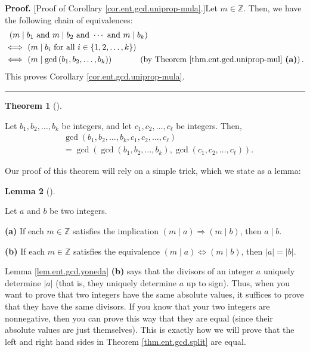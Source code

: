 \documentclass[numbers=enddot,12pt,final,onecolumn,notitlepage]{scrartcl}%
\numberwithin{exer}{subsection}
\theoremstyle{definition}
\newtheorem{theo}{Theorem}[subsection]
\newenvironment{theorem}[1][]
{\begin{theo}[#1]\begin{leftbar}}
{\end{leftbar}\end{theo}}
\newtheorem{lem}[theo]{Lemma}
\newenvironment{lemma}[1][]
{\begin{lem}[#1]\begin{leftbar}}
{\end{leftbar}\end{lem}}
\newenvironment{proof}[1][Proof]{\noindent\textbf{#1.} }{\ \rule{0.5em}{0.5em}}
\begin{document}
\begin{proof}
[Proof of Corollary \ref{cor.ent.gcd.uniprop-mula}.]Let $m\in\mathbb{Z}$.
Then, we have the following chain of equivalences:%
\begin{align*}
&  \ \left(  m\mid b_{1}\text{ and }m\mid b_{2}\text{ and }\cdots\text{ and
}m\mid b_{k}\right) \\
&  \Longleftrightarrow\ \left(  m\mid b_{i}\text{ for all }i\in\left\{
1,2,\ldots,k\right\}  \right) \\
&  \Longleftrightarrow\ \left(  m\mid\gcd\left(  b_{1},b_{2},\ldots
,b_{k}\right)  \right)  \ \ \ \ \ \ \ \ \ \ \left(  \text{by Theorem
\ref{thm.ent.gcd.uniprop-mul} \textbf{(a)}}\right)  .
\end{align*}
This proves Corollary \ref{cor.ent.gcd.uniprop-mula}.
\end{proof}

\begin{theorem}
\label{thm.ent.gcd.split}Let $b_{1},b_{2},\ldots,b_{k}$ be integers, and let
$c_{1},c_{2},\ldots,c_{\ell}$ be integers. Then,%
\begin{align*}
&  \gcd\left(  b_{1},b_{2},\ldots,b_{k},c_{1},c_{2},\ldots,c_{\ell}\right) \\
&  =\gcd\left(  \gcd\left(  b_{1},b_{2},\ldots,b_{k}\right)  ,\gcd\left(
c_{1},c_{2},\ldots,c_{\ell}\right)  \right)  .
\end{align*}

\end{theorem}

Our proof of this theorem will rely on a simple trick, which we state as a lemma:

\begin{lemma}
\label{lem.ent.gcd.yoneda}Let $a$ and $b$ be two integers.

\textbf{(a)} If each $m\in\mathbb{Z}$ satisfies the implication $\left(  m\mid
a\right)  \Longrightarrow\left(  m\mid b\right)  $, then $a\mid b$.

\textbf{(b)} If each $m\in\mathbb{Z}$ satisfies the equivalence $\left(  m\mid
a\right)  \Longleftrightarrow\left(  m\mid b\right)  $, then $\left\vert
a\right\vert =\left\vert b\right\vert $.
\end{lemma}

Lemma \ref{lem.ent.gcd.yoneda} \textbf{(b)} says that the divisors of an
integer $a$ uniquely determine $\left\vert a\right\vert $ (that is, they
uniquely determine $a$ up to sign). Thus, when you want to prove that two
integers have the same absolute values, it suffices to prove that they have
the same divisors. If you know that your two integers are nonnegative, then
you can prove this way that they are equal (since their absolute values are
just themselves). This is exactly how we will prove that the left and right
hand sides in Theorem \ref{thm.ent.gcd.split} are equal.
\end{document}
